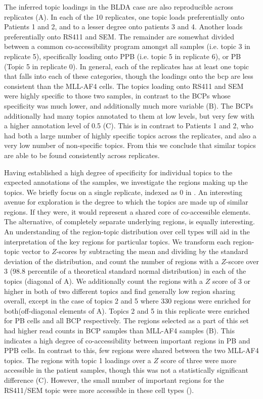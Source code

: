 The inferred topic loadings in the BLDA case are also reproducible across replicates (A). In each of the 10 replicates, one topic loads preferentially onto Patients 1 and 2, and to a lesser degree onto patients 3 and 4. Another loads preferentially onto RS411 and SEM. The remainder are somewhat divided between a common co-accessibility program amongst all samples (i.e. topic 3 in replicate 5), specifically loading onto PPB (i.e. topic 5 in replicate 6), or PB (Topic 5 in replicate 0). In general, each of the replicates has at least one topic that falls into each of these categories, though the loadings onto the \gls{bcp} are less consistent than the MLL-AF4 cells. The topics loading onto RS411 and SEM were highly specific to those two samples, in contrast to the BCPs whose specificity was much lower, and additionally much more variable (B).  The BCPs additionally had many topics annotated to them at low levels, but very few with a higher annotation level of 0.5 (C).  This is in contrast to Patients 1 and 2, who had both a large number of highly specific topics across the replicates, and also a very low number of non-specific topics.  From this we conclude that similar topics are able to be found consistently across replicates.  

Having established a high degree of specificity for individual topics to the expected annotations of the samples, we investigate the regions making up the topics. We briefly focus on a single replicate, indexed as 0 in . An interesting avenue for exploration is the degree to which the topics are made up of similar regions. If they were, it would represent a shared core of co-accessible elements. The alternative, of completely separate underlying regions, is equally interesting. An understanding of the region-topic distribution over cell types will aid in the interpretation of the key regions for particular topics. We transform each region-topic vector to $Z$-scores by subtracting the mean and dividing by the standard deviation of the distribution, and count the number of regions with a $Z$-score over 3 (98.8 percentile of a theoretical standard normal distribution) in each of the topics (diagonal of A). We additionally count the regions with a $Z$ score of 3 or higher in both of two different topics and find generally low region sharing overall, except in the case of topics 2 and 5 where 330 regions were enriched for both(off-diagonal elements of A). Topics 2 and 5 in this replicate were enriched for PB cells and all BCP respectively. The regions selected as a part of this set had higher read counts in BCP samples than MLL-AF4 samples (B).  This indicates a high degree of co-accessibility between important regions in PB and PPB cells. In contrast to this, few regions were shared between the two MLL-AF4 topics. The regions with topic 1 loadings over a $Z$ score of three were more accessible in the patient samples, though this was not a statistically significant difference (C). However, the small number of important regions for the RS411/SEM topic were more accessible in these cell types ().

